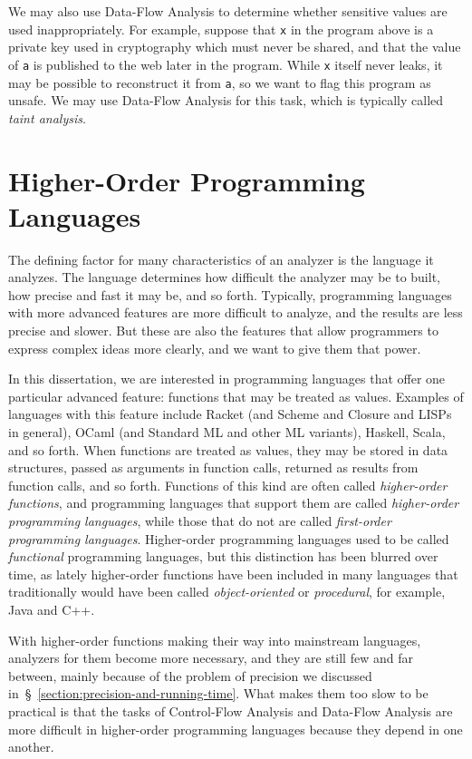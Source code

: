 \documentclass[12pt, oneside]{book}
\begin{document}
We may also use Data-Flow Analysis to determine whether sensitive values are used inappropriately. For example, suppose that \texttt{x} in the program above is a private key used in cryptography which must never be shared, and that the value of \texttt{a} is published to the web later in the program. While \texttt{x} itself never leaks, it may be possible to reconstruct it from \texttt{a}, so we want to flag this program as unsafe. We may use Data-Flow Analysis for this task, which is typically called \emph{taint analysis}.

\section{Higher-Order Programming Languages}
\label{section:higher-order-programming-languages}

The defining factor for many characteristics of an analyzer is the language it analyzes. The language determines how difficult the analyzer may be to built, how precise and fast it may be, and so forth. Typically, programming languages with more advanced features are more difficult to analyze, and the results are less precise and slower. But these are also the features that allow programmers to express complex ideas more clearly, and we want to give them that power.

In this dissertation, we are interested in programming languages that offer one particular advanced feature: functions that may be treated as values. Examples of languages with this feature include Racket (and Scheme and Closure and LISPs in general), OCaml (and Standard ML and other ML variants), Haskell, Scala, and so forth. When functions are treated as values, they may be stored in data structures, passed as arguments in function calls, returned as results from function calls, and so forth. Functions of this kind are often called \emph{higher-order functions}, and programming languages that support them are called \emph{higher-order programming languages}, while those that do not are called \emph{first-order programming languages}. Higher-order programming languages used to be called \emph{functional} programming languages, but this distinction has been blurred over time, as lately higher-order functions have been included in many languages that traditionally would have been called \emph{object-oriented} or \emph{procedural}, for example, Java and C++.

With higher-order functions making their way into mainstream languages, analyzers for them become more necessary, and they are still few and far between, mainly because of the problem of precision we discussed in~§~\ref{section:precision-and-running-time}. What makes them too slow to be practical is that the tasks of Control-Flow Analysis and Data-Flow Analysis are more difficult in higher-order programming languages because they depend in one another.
\end{document}
